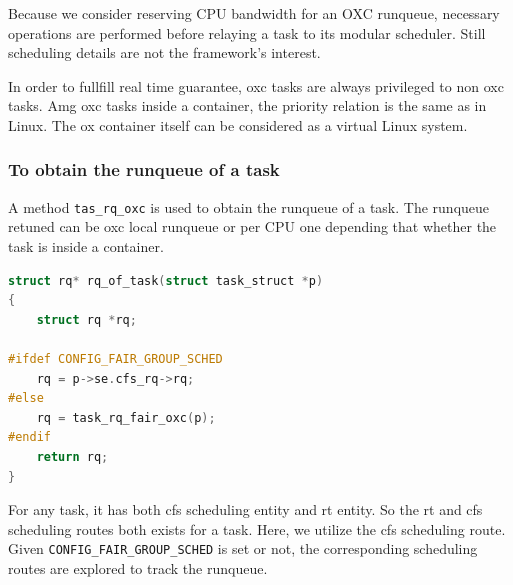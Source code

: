 Because we consider reserving CPU bandwidth for an OXC runqueue, necessary
operations are performed before relaying a task to its modular scheduler.
Still scheduling details are not the framework's interest. 

In order to fullfill real time guarantee, oxc tasks are always privileged
to non oxc tasks. Amg oxc tasks inside a container, the priority relation
is the same as in Linux. The ox container itself can be considered as a 
virtual Linux system.

\subsubsection{To obtain the runqueue of a task}
A method \texttt{tas\_rq\_oxc} is used to obtain the runqueue of a task.
The runqueue retuned can be oxc local runqueue or per CPU one depending
that whether the task is inside a container.
\begin{lstlisting}[language=C]
struct rq* rq_of_task(struct task_struct *p)
{
	struct rq *rq;

#ifdef CONFIG_FAIR_GROUP_SCHED
	rq = p->se.cfs_rq->rq;
#else
	rq = task_rq_fair_oxc(p);
#endif
	return rq;
}
\end{lstlisting}
For any task, it has both cfs scheduling entity and rt entity. So the
rt and cfs scheduling routes both exists for a task. Here, we utilize
the cfs scheduling route. Given \texttt{CONFIG\_FAIR\_GROUP\_SCHED}
is set or not, the corresponding scheduling routes are explored to
track the runqueue.

